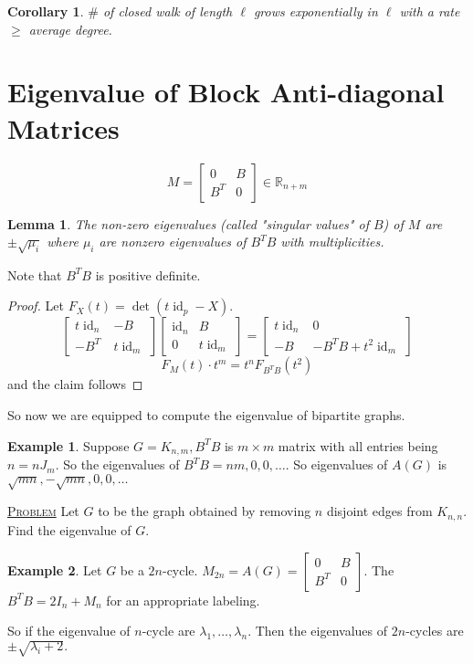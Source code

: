 \documentclass{report}
\newcommand{\R}{\mathbb{R}}
\def \id {\operatorname{id}}
\newcommand{\fancyem}[1]{\underline{\textsc{#1}}}
\newtheorem{corollary}{Corollary}[section]
\newtheorem{lemma}{Lemma}[section]
\theoremstyle{definition}
\newtheorem{example}{Example}[section]
\theoremstyle{remark}
\numberwithin{equation}{section}
\begin{document}
\begin{corollary} 
$\#$ of closed walk of length $\ell$ grows exponentially in $\ell$ with a rate $\geq$ average degree.
\end{corollary}


\section{Eigenvalue of Block Anti-diagonal Matrices}
\[M = \begin{bmatrix}
0 & B \\ B^{T} & 0
\end{bmatrix} \in \R_{n + m}\]

\begin{lemma}
The non-zero eigenvalues (called "singular values" of $B$) of $M$ are $\pm \sqrt{\mu_i}$ where $\mu_i$ are nonzero eigenvalues of $B^TB$ with multiplicities.
\end{lemma}
Note that $B^TB$ is positive definite.
\begin{proof} 
Let $F_X(t) = \det(t\id_p - X).$
\[
\begin{bmatrix}
t\id_n & -B \\
-B^T & t\id_m
\end{bmatrix}
\begin{bmatrix}
\id_n & B \\
0 & t\id_m
\end{bmatrix} = \begin{bmatrix}
t\id_n & 0 \\
-B & -B^TB + t^2\id_m
\end{bmatrix}
\]
\[
F_M(t) \cdot t^m = t^n F_{B^TB}(t^2)
\]
and the claim follows
\end{proof}

So now we are equipped to compute the eigenvalue of bipartite graphs.
\begin{example}
Suppose $G = K_{n, m}, B^TB$ is $m \times m$ matrix with all entries being $n = nJ_m.$
So the eigenvalues of $B^TB = nm, 0, 0, \ldots.$ So eigenvalues of $A(G)$ is $\sqrt{mn}, -\sqrt{mn}, 0, 0, \ldots$
\end{example}

\fancyem{Problem} Let $G$ to be the graph obtained by removing $n$ disjoint edges from $K_{n, n}.$ Find the eigenvalue of $G$.

\begin{example}
Let $G$ be a $2n$-cycle. $M_{2n} = A(G) = \begin{bmatrix}
0 & B \\ B^T & 0
\end{bmatrix}.$
The $B^TB = 2I_n + M_n$ for an appropriate labeling.

So if the eigenvalue of $n$-cycle are $\lambda_1, \ldots, \lambda_n.$ Then the eigenvalues of $2n$-cycles are $\pm\sqrt{\lambda_i + 2}.$
\end{example}
\end{document}
